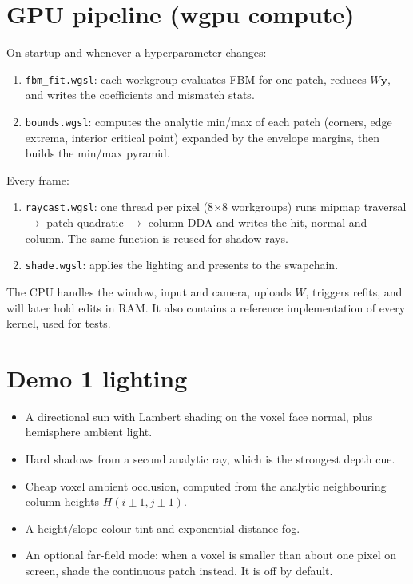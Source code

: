 \documentclass[11pt]{article}
\begin{document}
\section{GPU pipeline (wgpu compute)}
On startup and whenever a hyperparameter changes:
\begin{enumerate}
\item \texttt{fbm\_fit.wgsl}: each workgroup evaluates FBM for one patch, reduces $W\mathbf y$, and writes the coefficients and mismatch stats.
\item \texttt{bounds.wgsl}: computes the analytic min/max of each patch (corners, edge extrema, interior critical point) expanded by the envelope margins, then builds the min/max pyramid.
\end{enumerate}
Every frame:
\begin{enumerate}[resume]
\item \texttt{raycast.wgsl}: one thread per pixel (8$\times$8 workgroups) runs mipmap traversal $\to$ patch quadratic $\to$ column DDA and writes the hit, normal and column. The same function is reused for shadow rays.
\item \texttt{shade.wgsl}: applies the lighting and presents to the swapchain.
\end{enumerate}
The CPU handles the window, input and camera, uploads $W$, triggers refits, and will later hold edits in RAM. It also contains a reference implementation of every kernel, used for tests.

\section{Demo 1 lighting}
\begin{itemize}
\item A directional sun with Lambert shading on the voxel face normal, plus hemisphere ambient light.
\item Hard shadows from a second analytic ray, which is the strongest depth cue.
\item Cheap voxel ambient occlusion, computed from the analytic neighbouring column heights $H(i\pm1,j\pm1)$.
\item A height/slope colour tint and exponential distance fog.
\item An optional far-field mode: when a voxel is smaller than about one pixel on screen, shade the continuous patch instead. It is off by default.
\end{itemize}
\end{document}
